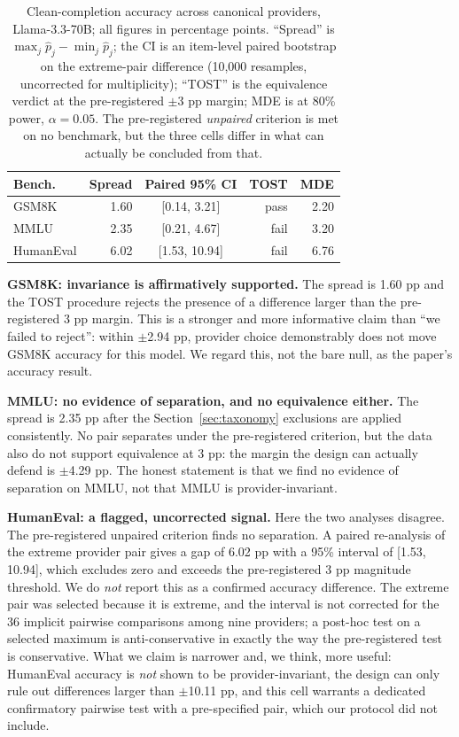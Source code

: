 \documentclass[11pt]{article}
\begin{document}
\begin{table}[t]
\centering
\footnotesize
\setlength{\tabcolsep}{4pt}
\begin{tabular}{lrcrr}
\toprule
\textbf{Bench.} & \textbf{Spread} & \textbf{Paired 95\% CI} & \textbf{TOST} & \textbf{MDE} \\
\midrule
GSM8K      & 1.60 & [0.14, 3.21]  & pass & 2.20 \\
MMLU       & 2.35 & [0.21, 4.67]  & fail & 3.20 \\
HumanEval  & 6.02 & [1.53, 10.94] & fail & 6.76 \\
\bottomrule
\end{tabular}
\caption{Clean-completion accuracy across canonical providers,
Llama-3.3-70B; all figures in percentage points. ``Spread'' is
$\max_j \hat{p}_j - \min_j \hat{p}_j$; the CI is an item-level paired
bootstrap on the extreme-pair difference (10,000 resamples,
uncorrected for multiplicity); ``TOST'' is the equivalence verdict at
the pre-registered $\pm$3 pp margin; MDE is at 80\% power,
$\alpha=0.05$. The pre-registered \emph{unpaired} criterion is met on
no benchmark, but the three cells differ in what can actually be
concluded from that.}
\label{tab:accuracy}
\end{table}

\textbf{GSM8K: invariance is affirmatively supported.} The spread is
1.60 pp and the TOST procedure rejects the presence of a difference
larger than the pre-registered 3 pp margin. This is a stronger and
more informative claim than ``we failed to reject'': within
$\pm$2.94 pp, provider choice demonstrably does not move GSM8K
accuracy for this model. We regard this, not the bare null, as the
paper's accuracy result.

\textbf{MMLU: no evidence of separation, and no equivalence either.}
The spread is 2.35 pp after the Section~\ref{sec:taxonomy} exclusions
are applied consistently. No pair separates under the pre-registered
criterion, but the data also do not support equivalence at 3 pp: the
margin the design can actually defend is $\pm$4.29 pp. The honest
statement is that we find no evidence of separation on MMLU, not that
MMLU is provider-invariant.

\textbf{HumanEval: a flagged, uncorrected signal.} Here the two
analyses disagree. The pre-registered unpaired criterion finds no
separation. A paired re-analysis of the extreme provider pair gives a
gap of 6.02 pp with a 95\% interval of [1.53, 10.94], which excludes
zero and exceeds the pre-registered 3 pp magnitude threshold. We do
\emph{not} report this as a confirmed accuracy difference. The extreme
pair was selected because it is extreme, and the interval is not
corrected for the 36 implicit pairwise comparisons among nine
providers; a post-hoc test on a selected maximum is anti-conservative
in exactly the way the pre-registered test is conservative. What we
claim is narrower and, we think, more useful: HumanEval accuracy is
\emph{not} shown to be provider-invariant, the design can only rule
out differences larger than $\pm$10.11 pp, and this cell warrants a
dedicated confirmatory pairwise test with a pre-specified pair, which
our protocol did not include.
\end{document}
